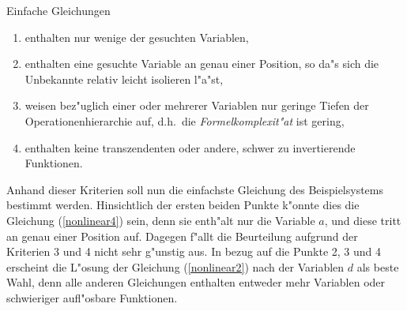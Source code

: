\noindent Einfache Gleichungen
\begin{enumerate}
\item enthalten nur wenige der gesuchten Variablen,
\item enthalten eine gesuchte Variable an genau einer Position, so da"s 
sich die Unbekannte relativ leicht isolieren l"a"st,
\item weisen bez"uglich einer oder mehrerer Variablen nur geringe Tiefen
der Operationenhierarchie auf, d.h.\ die {\em Formelkomplexit"at} ist
gering,
\item enthalten keine transzendenten oder andere, schwer zu 
invertierende Funktionen.
\end{enumerate}
Anhand dieser Kriterien soll nun die einfachste Gleichung des 
Beispielsystems bestimmt werden. Hinsichtlich der ersten beiden Punkte 
k"onnte dies die Gleichung (\ref{nonlinear4}) sein, denn sie enth"alt 
nur die Variable $a$, und diese tritt an genau einer Position auf. 
Dagegen f"allt die Beurteilung aufgrund der Kriterien 3 und 4 nicht sehr
g"unstig aus. In bezug auf die Punkte 2, 3 und 4 erscheint die L"osung
der Gleichung (\ref{nonlinear2}) nach der Variablen $d$ als beste Wahl,
denn alle anderen Gleichungen enthalten entweder mehr Variablen oder
schwieriger aufl"osbare Funktionen.


